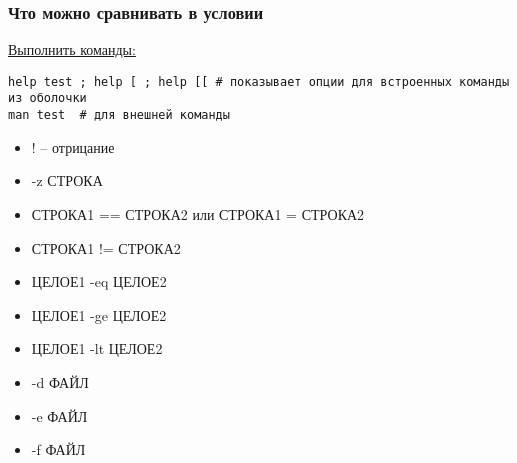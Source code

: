 \begin{frame}[fragile]
\frametitle{Что можно сравнивать в условии}

\underline{Выполнить команды:}
	\small\begin{lstlisting}
help test ; help [ ; help [[ # показывает опции для встроенных команды из оболочки
man test  # для внешней команды
\end{lstlisting}
    \pause
	\begin{itemize}
	    \item \alert{!} -- отрицание
	    \item \alert{-z} СТРОКА
	    \item СТРОКА1 \alert{==} СТРОКА2 или СТРОКА1 \alert{=} СТРОКА2
	    \item СТРОКА1 \alert{!=} СТРОКА2
	    \item ЦЕЛОЕ1 \alert{-eq} ЦЕЛОЕ2
	    \item ЦЕЛОЕ1 \alert{-ge} ЦЕЛОЕ2
	    \item ЦЕЛОЕ1 \alert{-lt} ЦЕЛОЕ2
	    \item \alert{-d} ФАЙЛ
	    \item \alert{-e} ФАЙЛ
	    \item \alert{-f} ФАЙЛ
	\end{itemize}

\end{frame}
